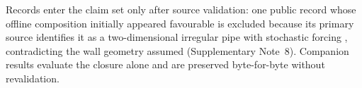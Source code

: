 Records enter the claim set only after source validation: one public record whose offline
composition initially appeared favourable is excluded because its primary source identifies it as
a two-dimensional irregular pipe with stochastic forcing \cite{du2024confild}, contradicting the
wall geometry assumed (Supplementary Note~8). Companion results evaluate the closure alone and are
preserved byte-for-byte without revalidation.
